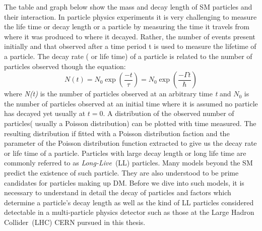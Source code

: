 The table and graph below show the mass and decay length of SM particles and their interaction.
 In particle physics experiments it is very challenging to measure the  life time or decay length or a particle  by measuring the time it travels from where it was produced to where it decayed. Rather, the number of events present initially and that observed after a time period t is used to measure the lifetime of a particle. The decay rate ( or life time) of a particle is related to the number of particles observed though the equation:
 \begin{equation}
 N(t) = N_{0}\exp\left(\frac{-t}{\tau}\right) = N_{0}\exp\left(\frac{-\Gamma t}{\hbar}\right) 
 \end{equation}
where \textit{N(t)} is the number of particles observed at an arbitrary time \textit{t} and $N_{0}$ is the number of particles observed at an initial time where it is assumed no particle has decayed yet usually at $ t = 0 $.
A distribution of the observed number of particles( usually a Poisson distribution) can be plotted with time measured. The resulting distribution if fitted with a Poisson distribution faction and the parameter of the Poisson distribution function extracted  to give us the decay rate or life time of a particle.
\newline
Particles with large decay length or long life time are commonly referred to as \textit{Long-Live}~(LL) particles. Many models beyond the SM predict the existence of such particle. They are also understood to be prime candidates for particles making up DM.
Before we dive into such models, it is necessary to understand in detail the decay of particles and factors which determine a particle's decay length as well as the kind of LL particles considered detectable in a multi-particle physics detector such as those at the Large Hadron Collider~(LHC) CERN pursued in this thesis.
